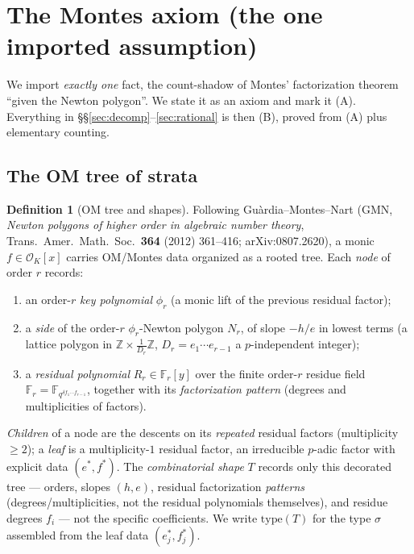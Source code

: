 \documentclass[11pt]{article}
\theoremstyle{definition}
\newtheorem{definition}[theorem]{Definition}
\theoremstyle{remark}
\newcommand{\OK}{\mathcal{O}_K}
\newcommand{\Fr}{\mathbb{F}_r}
\newcommand{\type}{\mathrm{type}}
\begin{document}
\section{The Montes axiom (the one imported assumption)}\label{sec:axiom}

We import \emph{exactly one} fact, the count-shadow of Montes' factorization
theorem ``given the Newton polygon''. We state it as an axiom and mark it (A).
Everything in \S\S\ref{sec:decomp}--\ref{sec:rational} is then (B), proved from
(A) plus elementary counting.

\subsection{The OM tree of strata}

\begin{definition}[OM tree and shapes]\label{def:omtree}
Following Gu\`ardia--Montes--Nart (GMN, \emph{Newton polygons of higher order in
algebraic number theory}, Trans.\ Amer.\ Math.\ Soc.\ \textbf{364} (2012)
361--416; arXiv:0807.2620), a monic $f\in\OK[x]$ carries OM/Montes data organized
as a rooted tree. Each \emph{node} of order $r$ records:
\begin{enumerate}[label=(\roman*),nosep]
\item an order-$r$ \emph{key polynomial} $\phi_r$ (a monic lift of the previous
residual factor);
\item a \emph{side} of the order-$r$ $\phi_r$-Newton polygon $N_r$, of slope
$-h/e$ in lowest terms (a lattice polygon in $\mathbb Z\times\frac1{D_r}\mathbb Z$,
$D_r=e_1\cdots e_{r-1}$ a $p$-independent integer);
\item a \emph{residual polynomial} $R_r\in\Fr[y]$ over the finite order-$r$
residue field $\Fr=\mathbb F_{q^{\delta f_1\cdots f_{r-1}}}$, together with its
\emph{factorization pattern} (degrees and multiplicities of factors).
\end{enumerate}
\emph{Children} of a node are the descents on its \emph{repeated} residual
factors (multiplicity $\ge2$); a \emph{leaf} is a multiplicity-$1$ residual
factor, an irreducible $p$-adic factor with explicit data $(e^\ast,f^\ast)$.
The \emph{combinatorial shape} $T$ records only this decorated tree --- orders,
slopes $(h,e)$, residual factorization \emph{patterns} (degrees/multiplicities,
not the residual polynomials themselves), and residue degrees $f_i$ --- not the
specific coefficients. We write $\type(T)$ for the type $\sigma$ assembled from
the leaf data $(e^\ast_j,f^\ast_j)$.
\end{definition}
\end{document}
